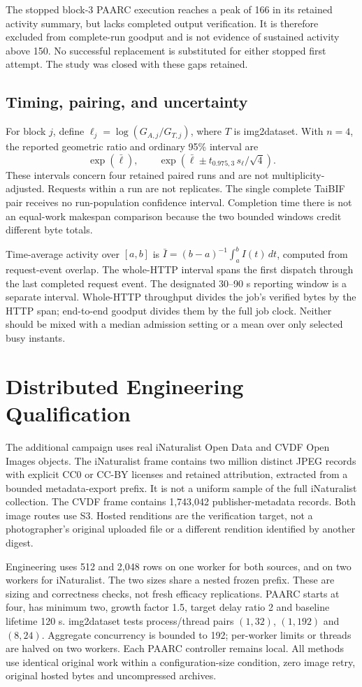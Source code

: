 \documentclass[10pt]{article}
\newcommand{\paarc}{PAARC}
\begin{document}
The stopped block-3 \paarc{} execution reaches a peak of 166 in its retained activity summary, but lacks completed output verification. It is therefore excluded from complete-run goodput and is not evidence of sustained activity above 150. No successful replacement is substituted for either stopped first attempt. The study was closed with these gaps retained.

\subsection{Timing, pairing, and uncertainty}
For block $j$, define $\ell_j=\log(G_{A,j}/G_{T,j})$, where $T$ is img2dataset. With $n=4$, the reported geometric ratio and ordinary 95\% interval are
\[
\exp(\bar\ell),\qquad \exp\!\left(\bar\ell\pm t_{0.975,3}\,s_{\ell}/\sqrt{4}\right).
\]
These intervals concern four retained paired runs and are not multiplicity-adjusted. Requests within a run are not replicates. The single complete TaiBIF pair receives no run-population confidence interval. Completion time there is not an equal-work makespan comparison because the two bounded windows credit different byte totals.

Time-average activity over $[a,b]$ is $\bar I=(b-a)^{-1}\int_a^b I(t)\,dt$, computed from request-event overlap. The whole-HTTP interval spans the first dispatch through the last completed request event. The designated 30--90 s reporting window is a separate interval. Whole-HTTP throughput divides the job's verified bytes by the HTTP span; end-to-end goodput divides them by the full job clock. Neither should be mixed with a median admission setting or a mean over only selected busy instants.

\section{Distributed Engineering Qualification}
The additional campaign uses real iNaturalist Open Data and CVDF Open Images objects. The iNaturalist frame contains two million distinct JPEG records with explicit CC0 or CC-BY licenses and retained attribution, extracted from a bounded metadata-export prefix. It is not a uniform sample of the full iNaturalist collection. The CVDF frame contains 1,743,042 publisher-metadata records. Both image routes use S3. Hosted renditions are the verification target, not a photographer's original uploaded file or a different rendition identified by another digest.

Engineering uses 512 and 2,048 rows on one worker for both sources, and on two workers for iNaturalist. The two sizes share a nested frozen prefix. These are sizing and correctness checks, not fresh efficacy replications. PAARC starts at four, has minimum two, growth factor 1.5, target delay ratio 2 and baseline lifetime 120 s. img2dataset tests process/thread pairs $(1,32)$, $(1,192)$ and $(8,24)$. Aggregate concurrency is bounded to 192; per-worker limits or threads are halved on two workers. Each PAARC controller remains local. All methods use identical original work within a configuration-size condition, zero image retry, original hosted bytes and uncompressed archives.
\end{document}
